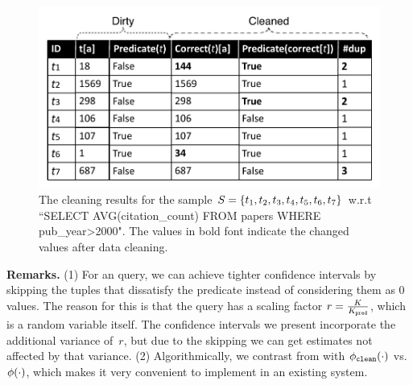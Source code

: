 \begin{figure}[t]\vspace{-1em}
\centering
\includegraphics[scale=0.45]{figs/sample.pdf}\vspace{-1em}
\caption{The cleaning results for the sample $S = \{t_1, t_2, t_3, t_4, t_5, t_6, t_7\}$  w.r.t ``SELECT \textsf{AVG}(citation\_count) FROM papers WHERE pub\_year>2000". The values in bold font indicate the changed values after data cleaning.}\vspace{-.5em}
\label{fig:sample}\vspace{-.5em}
\end{figure}

\vspace{.5em}
{\noindent \bf Remarks.} %
(1) For an \avgfunc query, we can achieve tighter confidence intervals by skipping the tuples that dissatisfy the predicate instead of considering them as 0 values.
The reason for this is that the \avgfunc query has a scaling factor $r=\frac{K}{K_{\texttt{pred} }}$, which is a random variable itself.
The confidence intervals we present incorporate the additional variance of~$r$, but due to the skipping we can get estimates not affected by that variance. (2) Algorithmically, we contrast \sampleclean from \saqp with $\phi_{\texttt{clean} } (\cdot)$ vs. $\phi (\cdot)$, which makes it very convenient to implement \sampleclean in an existing \saqp system.



